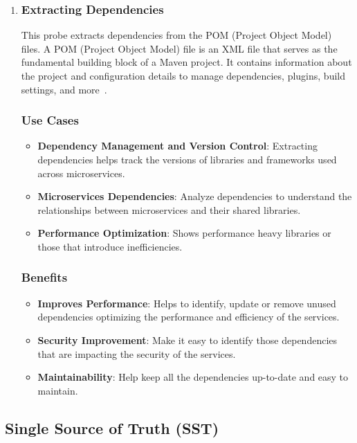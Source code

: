 \begin{enumerate}[leftmargin=*, label=\arabic*.]
    \item \subsubsection*{Extracting Dependencies}
   	This probe extracts dependencies from the POM (Project Object Model) files. A POM (Project Object Model) file is an XML file that serves as the fundamental building block of a Maven project. It contains information about the project and configuration details to manage dependencies, plugins, build settings, and more~\citep{pom_file_guide}.
	\subsubsection{Use Cases}
	\begin{itemize}[label=$\bullet$]
		\item \textbf{Dependency Management and Version Control}: Extracting dependencies helps track the versions of libraries and frameworks used across microservices.
		\item \textbf{Microservices Dependencies}: Analyze dependencies to understand the relationships between microservices and their shared libraries.
		\item \textbf{Performance Optimization}: Shows performance heavy libraries or those that introduce inefficiencies.
	\end{itemize}
	\subsubsection{Benefits}
	\begin{itemize}[label=$\bullet$]
		\item \textbf{Improves Performance}: Helps to identify, update or remove unused dependencies optimizing the performance and efficiency of the services.
		\item \textbf{Security Improvement}: Make it easy to identify those dependencies that are impacting the security of the services.
		\item \textbf{Maintainability}: Help keep all the dependencies up-to-date and easy to maintain.
	\end{itemize} 

\end{enumerate}

\subsection{Single Source of Truth (SST)}\label{subsec:component-sst}
